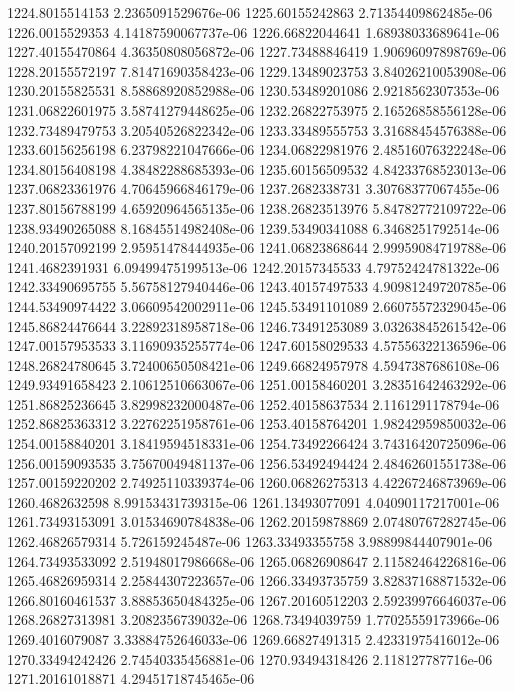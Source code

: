 {1224.8015514153 2.2365091529676e-06
1225.60155242863 2.71354409862485e-06
1226.0015529353 4.14187590067737e-06
1226.66822044641 1.68938033689641e-06
1227.40155470864 4.36350808056872e-06
1227.73488846419 1.90696097898769e-06
1228.20155572197 7.81471690358423e-06
1229.13489023753 3.84026210053908e-06
1230.20155825531 8.58868920852988e-06
1230.53489201086 2.9218562307353e-06
1231.06822601975 3.58741279448625e-06
1232.26822753975 2.16526858556128e-06
1232.73489479753 3.20540526822342e-06
1233.33489555753 3.31688454576388e-06
1233.60156256198 6.23798221047666e-06
1234.06822981976 2.48516076322248e-06
1234.80156408198 4.38482288685393e-06
1235.60156509532 4.84233768523013e-06
1237.06823361976 4.70645966846179e-06
1237.2682338731 3.30768377067455e-06
1237.80156788199 4.65920964565135e-06
1238.26823513976 5.84782772109722e-06
1238.93490265088 8.16845514982408e-06
1239.53490341088 6.3468251792514e-06
1240.20157092199 2.95951478444935e-06
1241.06823868644 2.99959084719788e-06
1241.4682391931 6.09499475199513e-06
1242.20157345533 4.79752424781322e-06
1242.33490695755 5.56758127940446e-06
1243.40157497533 4.90981249720785e-06
1244.53490974422 3.06609542002911e-06
1245.53491101089 2.66075572329045e-06
1245.86824476644 3.22892318958718e-06
1246.73491253089 3.03263845261542e-06
1247.00157953533 3.11690935255774e-06
1247.60158029533 4.57556322136596e-06
1248.26824780645 3.72400650508421e-06
1249.66824957978 4.5947387686108e-06
1249.93491658423 2.10612510663067e-06
1251.00158460201 3.28351642463292e-06
1251.86825236645 3.82998232000487e-06
1252.40158637534 2.1161291178794e-06
1252.86825363312 3.22762251958761e-06
1253.40158764201 1.98242959850032e-06
1254.00158840201 3.18419594518331e-06
1254.73492266424 3.74316420725096e-06
1256.00159093535 3.75670049481137e-06
1256.53492494424 2.48462601551738e-06
1257.00159220202 2.74925110339374e-06
1260.06826275313 4.42267246873969e-06
1260.4682632598 8.99153431739315e-06
1261.13493077091 4.04090117217001e-06
1261.73493153091 3.01534690784838e-06
1262.20159878869 2.07480767282745e-06
1262.46826579314 5.726159245487e-06
1263.33493355758 3.98899844407901e-06
1264.73493533092 2.51948017986668e-06
1265.06826908647 2.11582464226816e-06
1265.46826959314 2.25844307223657e-06
1266.33493735759 3.82837168871532e-06
1266.80160461537 3.88853650484325e-06
1267.20160512203 2.59239976646037e-06
1268.26827313981 3.2082356739032e-06
1268.73494039759 1.77025559173966e-06
1269.4016079087 3.33884752646033e-06
1269.66827491315 2.42331975416012e-06
1270.33494242426 2.74540335456881e-06
1270.93494318426 2.118127787716e-06
1271.20161018871 4.29451718745465e-06
}
